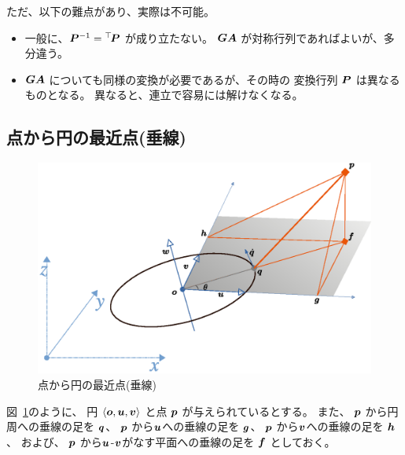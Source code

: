 \documentclass[11pt,a4j]{jarticle}
\def\figref#1{図~\ref{#1}}
\begin{document}
ただ、以下の難点があり、実際は不可能。
\begin{itemize}
  \item 一般に、${\bm{P} }^{-1} = {}^{\top}\!{{\bm{P} }}$ が成り立たない。
      ${\bm{G} }{\bm{A} }$ が対称行列であればよいが、多分違う。
  \item ${\bm{G} }{\bm{A} }$ についても同様の変換が必要であるが、その時の
    変換行列 ${\bm{P} }$ は異なるものとなる。
    異なると、連立で容易には解けなくなる。
\end{itemize}


\subsection{点から円の最近点(垂線)}

\begin{figure}[h]
  \centering
  \includegraphics[width=.8\linewidth]{Fig/figure-06.eps}
  \caption{点から円の最近点(垂線)}
  \label{fig:Fig/figure-06.eps}
\end{figure}

\figref{fig:Fig/figure-06.eps}のように、
円 $\left< {\bm{o}}, {\bm{u}}, {\bm{v}} \right>$ と点 ${\bm{p}}$ が与えられているとする。
また、
${\bm{p}}$ から円周への垂線の足を ${\bm{q}}$、
${\bm{p}}$ から${\bm{u}}$への垂線の足を ${\bm{g}}$、
${\bm{p}}$ から${\bm{v}}$への垂線の足を ${\bm{h}}$、
および、
${\bm{p}}$ から${\bm{u}}$-${\bm{v}}$がなす平面への垂線の足を ${\bm{f}}$
としておく。
\end{document}
